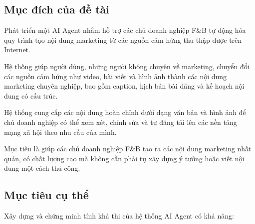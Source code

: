 \subsection{Mục đích của đề
tài}\label{mux1ee5c-ux111uxedch-cux1ee7a-ux111ux1ec1-tuxe0i}

Phát triển một AI Agent nhằm hỗ trợ các chủ doanh nghiệp F\&B tự động
hóa quy trình tạo nội dung marketing từ các nguồn cảm hứng thu thập được
trên Internet.

Hệ thống giúp người dùng, những người không chuyên về marketing, chuyển
đổi các nguồn cảm hứng như video, bài viết và hình ảnh thành các nội
dung marketing chuyên nghiệp, bao gồm caption, kịch bản bài đăng và kế
hoạch nội dung có cấu trúc.

Hệ thống cung cấp các nội dung hoàn chỉnh dưới dạng văn bản và hình ảnh
để chủ doanh nghiệp có thể xem xét, chỉnh sửa và tự đăng tải lên các nền
tảng mạng xã hội theo nhu cầu của mình.

Mục tiêu là giúp các chủ doanh nghiệp F\&B tạo ra các nội dung marketing
nhất quán, có chất lượng cao mà không cần phải tự xây dựng ý tưởng hoặc
viết nội dung một cách thủ công.

\subsection{Mục tiêu cụ thể}\label{mux1ee5c-tiuxeau-cux1ee5-thux1ec3}

Xây dựng và chứng minh tính khả thi của hệ thống AI Agent có khả năng:

